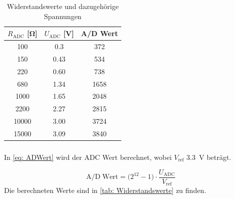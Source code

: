 \begin{table}[htb]
    \centering
    \caption{Widerstandswerte und dazugehörige Spannungen}
    \label{tab: Widerstandswerte}
    \begin{tabular}{ccc}
        \toprule
        $R_{\text{ADC}}$ [\si{\ohm}]& $U_{\text{ADC}}$  [\si{\volt}] & A/D Wert \\
        \midrule
        \num{100} & \num{0.3} & \num{372} \\
        \num{150} & \num{0.43} & \num{534}\\
        \num{220} & \num{0.60} & \num{738}\\
		\num{680} & \num{1.34} & \num{1658}\\
		\num{1000} & \num{1.65} & \num{2048}\\
		\num{2200} & \num{2.27} & \num{2815}\\
		\num{10000} & \num{3.00} & \num{3724}\\
		\num{15000} & \num{3.09} & \num{3840}\\
        \bottomrule
    \end{tabular}
\end{table}

\subsubsection{}
In \autoref{eq: ADWert} wird der ADC Wert berechnet, wobei $V_{\text{ref}}$  \SI{3.3}{\volt} beträgt.


\begin{equation}
\label{eq: ADWert}
\text{A/D}\; \text{Wert}=\big(2^{12}-1\big)\cdot \frac{U_{\text{ADC}}}{V_{\text{ref}}}
\end{equation}
Die berechneten Werte sind in \autoref{tab: Widerstandswerte} zu finden.

